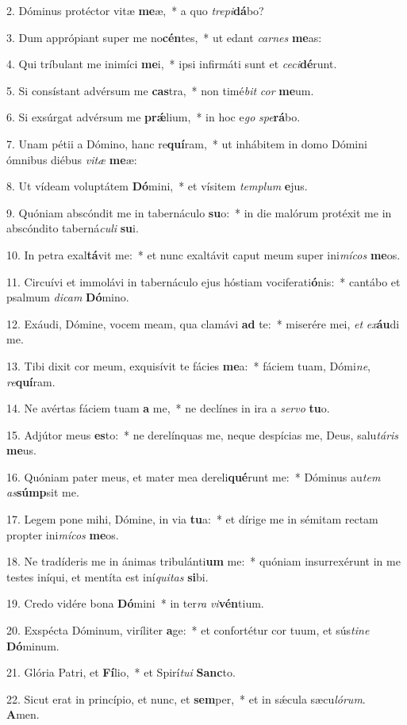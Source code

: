 2. Dóminus protéctor vitæ \textbf{me}æ,~*  a quo \textit{tre}\textit{pi}\textbf{dá}bo?\

3. Dum apprópiant super me no\textbf{cén}tes,~*  ut edant \textit{car}\textit{nes} \textbf{me}as:\

4. Qui tríbulant me inimíci \textbf{me}i,~*  ipsi infirmáti sunt et \textit{ce}\textit{ci}\textbf{dé}runt.\

5. Si consístant advérsum me \textbf{cas}tra,~*  non timé\textit{bit} \textit{cor} \textbf{me}um.\

6. Si exsúrgat advérsum me \textbf{prǽ}lium,~*  in hoc e\textit{go} \textit{spe}\textbf{rá}bo.\

7. Unam pétii a Dómino, hanc re\textbf{quí}ram,~*  ut inhábitem in domo Dómini ómnibus diébus \textit{vi}\textit{tæ} \textbf{me}æ:\

8. Ut vídeam voluptátem \textbf{Dó}mini,~*  et vísitem \textit{tem}\textit{plum} \textbf{e}jus.\

9. Quóniam abscóndit me in tabernáculo \textbf{su}o:~*  in die malórum protéxit me in abscóndito taberná\textit{cu}\textit{li} \textbf{su}i.\

10. In petra exal\textbf{tá}vit me:~*  et nunc exaltávit caput meum super ini\textit{mí}\textit{cos} \textbf{me}os.\

11. Circuívi et immolávi in tabernáculo ejus hóstiam vociferati\textbf{ó}nis:~*  cantábo et psalmum \textit{di}\textit{cam} \textbf{Dó}mino.\

12. Exáudi, Dómine, vocem meam, qua clamávi \textbf{ad} te:~*  miserére mei, \textit{et} \textit{ex}\textbf{áu}di me.\

13. Tibi dixit cor meum, exquisívit te fácies \textbf{me}a:~*  fáciem tuam, Dómi\textit{ne}, \textit{re}\textbf{quí}ram.\

14. Ne avértas fáciem tuam \textbf{a} me,~*  ne declínes in ira a \textit{ser}\textit{vo} \textbf{tu}o.\

15. Adjútor meus \textbf{es}to:~*  ne derelínquas me, neque despícias me, Deus, salu\textit{tá}\textit{ris} \textbf{me}us.\

16. Quóniam pater meus, et mater mea dereli\textbf{qué}runt me:~*  Dóminus au\textit{tem} \textit{as}\textbf{súmp}sit me.\

17. Legem pone mihi, Dómine, in via \textbf{tu}a:~*  et dírige me in sémitam rectam propter ini\textit{mí}\textit{cos} \textbf{me}os.\

18. Ne tradíderis me in ánimas tribulánti\textbf{um} me:~*  quóniam insurrexérunt in me testes iníqui, et mentíta est iní\textit{qui}\textit{tas} \textbf{si}bi.\

19. Credo vidére bona \textbf{Dó}mini~*  in ter\textit{ra} \textit{vi}\textbf{vén}tium.\

20. Exspécta Dóminum, viríliter \textbf{a}ge:~*  et confortétur cor tuum, et sús\textit{ti}\textit{ne} \textbf{Dó}minum.\

21. Glória Patri, et \textbf{Fí}lio,~*  et Spirí\textit{tu}\textit{i} \textbf{Sanc}to.\

22. Sicut erat in princípio, et nunc, et \textbf{sem}per,~*  et in sǽcula sæcu\textit{ló}\textit{rum}. \textbf{A}men.\

